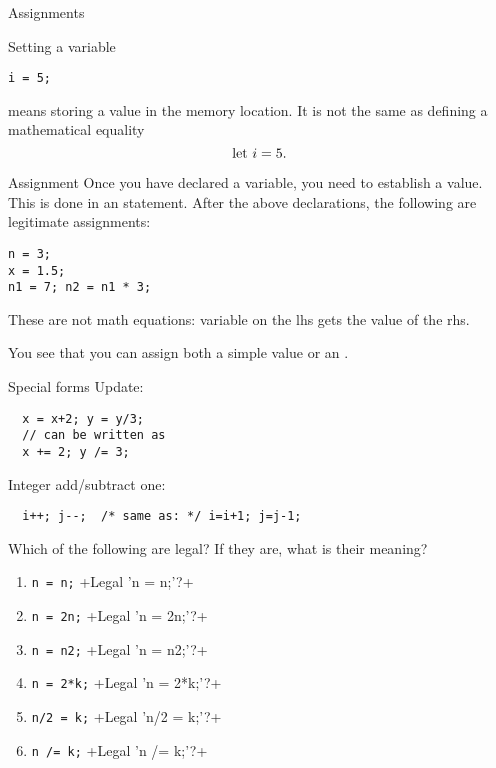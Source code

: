  {Assignments}
\label{c:assign}

Setting a variable
\begin{lstlisting}
i = 5;
\end{lstlisting}
means storing a value in the memory location. It is
not the same as defining a mathematical equality
\[ \hbox{let $i=5$}. \]

\begin{block}{Assignment}
  \label{sl:assign1}
  Once you have declared a variable, you need to establish a value. This is done in an
   statement. After the above declarations, the
  following are legitimate assignments:
\begin{lstlisting}
n = 3;
x = 1.5;
n1 = 7; n2 = n1 * 3;
\end{lstlisting}
These are not math equations: variable on the lhs gets the value of
the rhs.

You see that you can assign both a simple value or an
.
\end{block}

\begin{block}{Special forms}
  \label{sl:special-assign}
  Update:
\begin{lstlisting}
  x = x+2; y = y/3;
  // can be written as
  x += 2; y /= 3;
\end{lstlisting}
Integer add/subtract one:
\begin{lstlisting}
  i++; j--;  /* same as: */ i=i+1; j=j-1;
\end{lstlisting}
\end{block}

\begin{exercise}
  \label{q:assign}
  Which of the following are legal? If they are, what is their meaning?
  \begin{enumerate}
  \item \lstinline{n = n;}
    \slackpollTF+Legal 'n = n;'?+
  \item \lstinline{n = 2n;}
    \slackpollTF+Legal 'n = 2n;'?+
  \item \lstinline{n = n2;}
    \slackpollTF+Legal 'n = n2;'?+
  \item \lstinline{n = 2*k;}
    \slackpollTF+Legal 'n = 2*k;'?+
  \item \lstinline{n/2 = k;}
    \slackpollTF+Legal 'n/2 = k;'?+
  \item \lstinline{n /= k;}
    \slackpollTF+Legal 'n /= k;'?+
  \end{enumerate}
\end{exercise}

